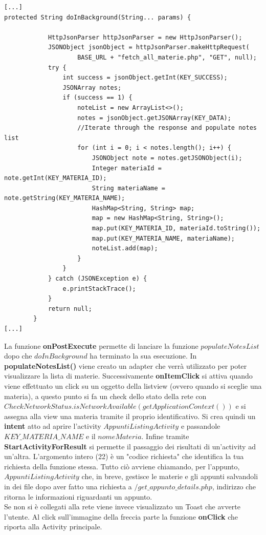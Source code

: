 \documentclass[a4paper, 50pt, twoside]{article}
\begin{document}
\begin{lstlisting}
[...]
protected String doInBackground(String... params) {

            HttpJsonParser httpJsonParser = new HttpJsonParser();
            JSONObject jsonObject = httpJsonParser.makeHttpRequest(
                    BASE_URL + "fetch_all_materie.php", "GET", null);
            try {
                int success = jsonObject.getInt(KEY_SUCCESS);
                JSONArray notes;
                if (success == 1) {
                    noteList = new ArrayList<>();
                    notes = jsonObject.getJSONArray(KEY_DATA);
                    //Iterate through the response and populate notes list
                    for (int i = 0; i < notes.length(); i++) {
                        JSONObject note = notes.getJSONObject(i);
                        Integer materiaId = note.getInt(KEY_MATERIA_ID);
                        String materiaName = note.getString(KEY_MATERIA_NAME);
                        HashMap<String, String> map;
                        map = new HashMap<String, String>();
                        map.put(KEY_MATERIA_ID, materiaId.toString());
                        map.put(KEY_MATERIA_NAME, materiaName);
                        noteList.add(map);
                    }
                }
            } catch (JSONException e) {
                e.printStackTrace();
            }
            return null;
        }
[...]
\end{lstlisting}
La funzione \textbf{onPostExecute} permette di lanciare la funzione $populateNotesList$ dopo che $doInBackground$ ha terminato la sua esecuzione.
In \textbf{populateNotesList()} viene creato un adapter che verrà utilizzato per poter visualizzare la lista di materie. Successivamente \textbf{onItemClick} si attiva quando viene effettuato un click su un oggetto della listview (ovvero quando si sceglie una materia), a questo punto si fa un check dello stato della rete con $CheckNetworkStatus.isNetworkAvailable(getApplicationContext())$ e si assegna alla view una materia tramite il proprio identificativo. Si crea quindi un \textbf{intent} atto ad aprire l'activity $AppuntiListingActivity$ e passandole $KEY\_MATERIA\_NAME$ e il $nomeMateria$. Infine tramite \textbf{StartActivityForResult} si permette il passaggio dei risultati di un'activity ad un'altra. L'argomento intero (22) è un "codice richiesta" che identifica la tua richiesta della funzione stessa. Tutto ciò avviene chiamando, per l'appunto, $AppuntiListingActivity$ che, in breve, gestisce le materie e gli appunti salvandoli in dei file dopo aver fatto una richiesta a $/get\_appunto\_details.php$, indirizzo che ritorna le informazioni riguardanti un appunto.
\\Se non si è collegati alla rete viene invece visualizzato un Toast che avverte l'utente. Al click sull'immagine della freccia parte la funzione \textbf{onClick} che riporta alla Activity principale.
\end{document}
